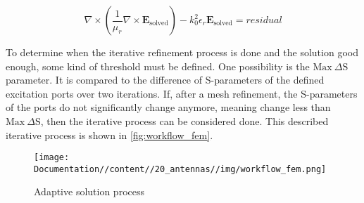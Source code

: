 \begin{equation}
    \nabla\times\left(\frac{1}{\mu_r}\nabla\times\mathbf{E}_{\mathrm{solved}}\right)-k_0^2\epsilon_r\mathbf{E}_{\mathrm{solved}}=residual
    \label{eqn:full_wave_equation_solved}
\end{equation}

To determine when the iterative refinement process is done and the solution good enough, some kind of threshold must be defined. One possibility is the $\mathrm{Max}\ \Delta \mathrm{S}$ parameter. It is compared to the difference of S-parameters of the defined excitation ports over two iterations. If, after a mesh refinement, the S-parameters of the ports do not significantly change anymore, meaning change less than $\mathrm{Max}\ \Delta \mathrm{S}$, then the iterative process can be considered done. This described iterative process is shown in \autoref{fig:workflow_fem}. 

\begin{figure}[h]
    \centering
    \texttt{[image: Documentation//content//20\_antennas//img/workflow\_fem.png]}
    \caption{Adaptive solution process}
    \label{fig:workflow_fem}
\end{figure}



